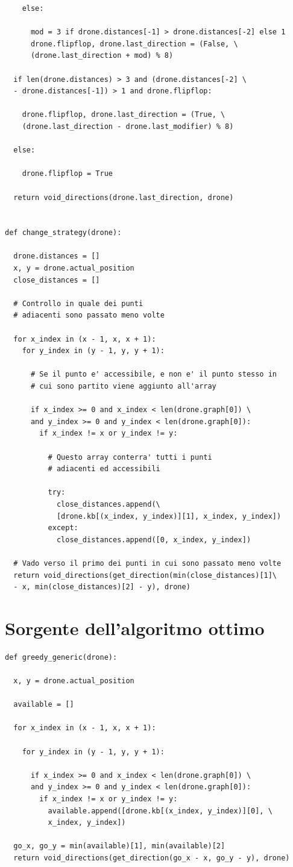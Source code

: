 \begin{verbatim}
    else:

      mod = 3 if drone.distances[-1] > drone.distances[-2] else 1
      drone.flipflop, drone.last_direction = (False, \
      (drone.last_direction + mod) % 8)

  if len(drone.distances) > 3 and (drone.distances[-2] \
  - drone.distances[-1]) > 1 and drone.flipflop:

    drone.flipflop, drone.last_direction = (True, \
    (drone.last_direction - drone.last_modifier) % 8)

  else:

    drone.flipflop = True

  return void_directions(drone.last_direction, drone)


def change_strategy(drone):

  drone.distances = []
  x, y = drone.actual_position
  close_distances = []

  # Controllo in quale dei punti 
  # adiacenti sono passato meno volte

  for x_index in (x - 1, x, x + 1):
    for y_index in (y - 1, y, y + 1):

      # Se il punto e' accessibile, e non e' il punto stesso in 
      # cui sono partito viene aggiunto all'array

      if x_index >= 0 and x_index < len(drone.graph[0]) \
      and y_index >= 0 and y_index < len(drone.graph[0]):
        if x_index != x or y_index != y:

          # Questo array conterra' tutti i punti 
          # adiacenti ed accessibili

          try:
            close_distances.append(\
            [drone.kb[(x_index, y_index)][1], x_index, y_index])
          except:
            close_distances.append([0, x_index, y_index])

  # Vado verso il primo dei punti in cui sono passato meno volte
  return void_directions(get_direction(min(close_distances)[1]\
  - x, min(close_distances)[2] - y), drone)

\end{verbatim}


\section{Sorgente dell'algoritmo ottimo}
\begin{verbatim}
def greedy_generic(drone):

  x, y = drone.actual_position

  available = []

  for x_index in (x - 1, x, x + 1):

    for y_index in (y - 1, y, y + 1):

      if x_index >= 0 and x_index < len(drone.graph[0]) \
      and y_index >= 0 and y_index < len(drone.graph[0]):
        if x_index != x or y_index != y:
          available.append([drone.kb[(x_index, y_index)][0], \
          x_index, y_index])

  go_x, go_y = min(available)[1], min(available)[2]
  return void_directions(get_direction(go_x - x, go_y - y), drone)

\end{verbatim}
	

